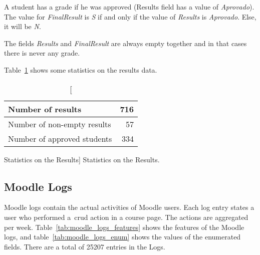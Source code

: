 A student has a grade if he was approved (Results field has a value of
\textit{Aprovado}). The value for \textit{FinalResult} is \textit{S} if and
only if the value of \textit{Results} is \textit{Aprovado}. Else, it will be
\textit{N}.

The fields \textit{Results} and \textit{FinalResult} are always empty together
and in that cases there is never any grade.

Table~\ref{tab:results_stats} shows some statistics on the results data.

\begin{table}[h!]
    \centering

    \begin{tabular}{| l | r |}
        \hline
        Number of results           & 716 \\ \hline
        Number of non-empty results & 57  \\ \hline
        Number of approved students & 334 \\ \hline
    \end{tabular}

    \caption
        [Statistics on the Results]
        {Statistics on the Results.}

    \label{tab:results_stats}
\end{table}

\subsection{Moodle Logs}
\label{sec:logs}

Moodle logs contain the actual activities of Moodle users. Each log entry
states a user who performed a~\gls{crud} action in a course page. The actions
are aggregated per week. Table~\ref{tab:moodle_logs_features} shows the
features of the Moodle logs, and table~\ref{tab:moodle_logs_enum} shows the
values of the enumerated fields. There are a total of 25207 entries in the
Logs.

